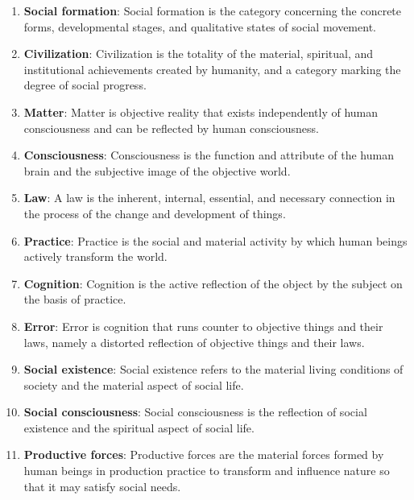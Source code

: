 \documentclass[12pt,a4paper]{ctexart}
\begin{document}
\begin{enumerate}[leftmargin=2em]
    \item \textbf{Social formation}: Social formation is the category concerning the concrete forms, developmental stages, and qualitative states of social movement.
    
    \item \textbf{Civilization}: Civilization is the totality of the material, spiritual, and institutional achievements created by humanity, and a category marking the degree of social progress.
    
    \item \textbf{Matter}: Matter is objective reality that exists independently of human consciousness and can be reflected by human consciousness.
    
    \item \textbf{Consciousness}: Consciousness is the function and attribute of the human brain and the subjective image of the objective world.
    
    \item \textbf{Law}: A law is the inherent, internal, essential, and necessary connection in the process of the change and development of things.
    
    \item \textbf{Practice}: Practice is the social and material activity by which human beings actively transform the world.
    
    \item \textbf{Cognition}: Cognition is the active reflection of the object by the subject on the basis of practice.
    
    \item \textbf{Error}: Error is cognition that runs counter to objective things and their laws, namely a distorted reflection of objective things and their laws.
    
    \item \textbf{Social existence}: Social existence refers to the material living conditions of society and the material aspect of social life.
    
    \item \textbf{Social consciousness}: Social consciousness is the reflection of social existence and the spiritual aspect of social life.
    
    \item \textbf{Productive forces}: Productive forces are the material forces formed by human beings in production practice to transform and influence nature so that it may satisfy social needs.
    

\end{enumerate}
\end{document}

